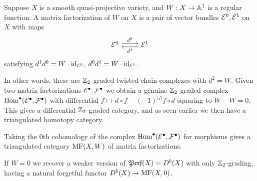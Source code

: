 \begin{definition}{}{}
    Suppose $X$ is a smooth quasi-projective variety, and $W:X\to\mathbb{A}^1$ is a
    regular function. A matrix factorization of $W$ on $X$ is a pair of vector
    bundles $\mathcal{E}^0,\mathcal{E}^1$ on $X$ with maps
    \begin{equation*}
        \begin{tikzcd}
            \calE^0 \ar[r,"d^0",shift left] & \calE^1 \ar[l,"d^1",shift left]
        \end{tikzcd}
    \end{equation*}
    satisfying $d^1d^0=W\cdot\mathrm{id}_{\mathcal{E}^0}$, $d^0d^1=W\cdot\mathrm{id}_{\mathcal{E}^1}$.
\end{definition}

In other words, these are $\mathbb{Z}_2$-graded twisted chain complexes with $d^2=W$.
Given two matrix factorizations $\mathcal{E}^\bullet,\mathcal{F}^\bullet$ we obtain a
genuine $\mathbb{Z}_2$-graded complex $\operatorname{Hom}^\bullet(\mathcal{E}^\bullet,\mathcal{F}^\bullet)$ with
differential $f\mapsto d\circ f-(-1)^{|f|}f\circ d$ squaring to $W-W=0$. This
gives a differential $\mathbb{Z}_2$-graded category, and as seen earlier we then have a
triangulated homotopy category.

\begin{definition}{}{}
    Taking the 0th cohomology of the complex
    $\operatorname{Hom}^\bullet(\mathcal{E}^\bullet,\mathcal{F}^\bullet)$ for morphisms gives a
    triangulated category $\mathrm{MF}(X,W)$ of matrix factorizations.
\end{definition}

\begin{remark}{}{}
    If $W=0$ we recover a weaker version of $\operatorname{\mathfrak{Perf}}(X)=D^b(X)$ with only
    $\mathbb{Z}_2$-grading, having a natural forgetful functor $D^b(X)\to\mathrm{MF}(X,0)$.
\end{remark}

